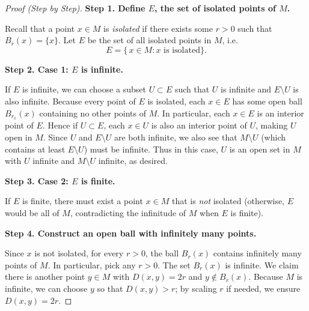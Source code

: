 \documentclass[12pt]{article}
\theoremstyle{definition} %
\theoremstyle{plain} %
\begin{document}
                \begin{proof}[Proof (Step by Step)]
                \textbf{Step 1. Define $E$, the set of isolated points of $M$.}
                
                Recall that a point $x \in M$ is \emph{isolated} if there exists some $r>0$ such that $B_r(x) = \{x\}$.  
                Let $E$ be the set of all isolated points in $M$, i.e.
                \[
                E = \{\, x \in M : x \text{ is isolated}\}.
                \]
                
                \medskip
                
                \textbf{Step 2. Case 1: $E$ is infinite.}
                
                If $E$ is infinite, we can choose a subset $U \subset E$ such that $U$ is infinite and $E \setminus U$ is also infinite.  
                Because every point of $E$ is isolated, each $x \in E$ has some open ball $B_{r_x}(x)$ containing no other points of $M$.  In particular, each $x \in E$ is an interior point of $E$.  
                Hence if $U \subset E$, each $x \in U$ is also an interior point of $U$, making $U$ open in $M$.  
                Since $U$ and $E \setminus U$ are both infinite, we also see that $M\setminus U$ (which contains at least $E \setminus U$) must be infinite.  
                Thus in this case, $U$ is an open set in $M$ with $U$ infinite and $M\setminus U$ infinite, as desired.
                
                \medskip
                
                \textbf{Step 3. Case 2: $E$ is finite.}
                
                If $E$ is finite, there must exist a point $x \in M$ that is \emph{not} isolated (otherwise, $E$ would be all of $M$, contradicting the infinitude of $M$ when $E$ is finite).
                
                \medskip
                
                \textbf{Step 4. Construct an open ball with infinitely many points.}
                
                Since $x$ is not isolated, for every $r>0$, the ball $B_r(x)$ contains infinitely many points of $M$.  
                In particular, pick any $r>0$.  The set $B_r(x)$ is infinite.  
                We claim there is another point $y \in M$ with $D(x,y) = 2r$ and $y \notin B_r(x)$.  
                Because $M$ is infinite, we can choose $y$ so that $D(x,y) > r$; by scaling $r$ if needed, we ensure $D(x,y) = 2r$.  
                

\end{proof}
\end{document}
